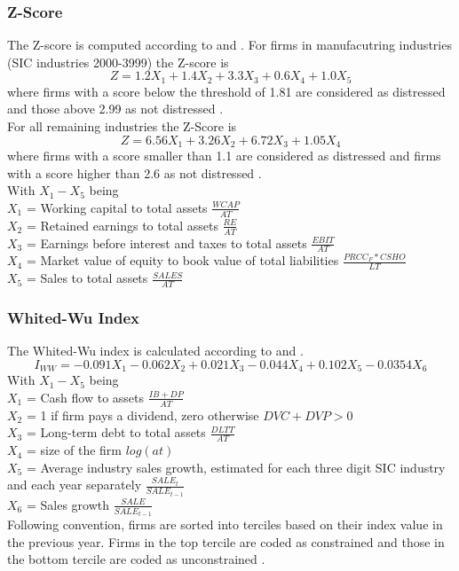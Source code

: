 \documentclass[12pt]{article}
\begin{document}
\subsubsection{Z-Score}
The Z-score is computed according to \citet[p.549]{Altman1968} and \citet[p.14]{Altman2002}. For firms in manufacutring industries (SIC industries 2000-3999) the Z-score is $$Z=1.2X_{1}+1.4X_{2}+3.3X_{3}+0.6X_{4}+1.0X_{5}$$ where firms with a score below the threshold of 1.81 are considered as distressed and those above 2.99 as not distressed \citep[p.14]{Altman2002}.\\
For all remaining industries the Z-Score is $$Z=6.56X_{1}+3.26X_{2}+6.72X_{3}+1.05X_{4}$$	
where firms with a score smaller than 1.1 are considered as distressed \citep[p.18]{Altman2002} and firms with a score higher than 2.6 as not distressed \citep[p.175]{Sulub2014}.\\
With $X_{1}- X_{5}$ being \\
	\indent$X_{1}$ = Working capital to total assets $\frac{WCAP}{AT}$\\
	\indent$X_{2}$ = Retained earnings to total assets $\frac{RE}{AT}$\\
	\indent$X_{3}$ = Earnings before interest and taxes to total assets $\frac{EBIT}{AT}$\\
	\indent$X_{4}$ = Market value of equity to book value of total liabilities $\frac{PRCC_F*CSHO}{LT}$\\
	\indent$X_{5}$ = Sales to total assets $\frac{SALES}{AT}$

\subsubsection{Whited-Wu Index}
The Whited-Wu index is calculated according to \citet[p.543]{Whited2006} and \citet[p.6]{Farre-mensa2013}. $$I_{WW}=-0.091X_{1}-0.062X_{2}+0.021X_{3}-0.044X_{4}+0.102X_{5}-0.0354X_{6}$$ With $X_{1}- X_{5}$ being \\
	\indent$X_{1}$ = Cash flow to assets $\frac{IB+DP}{AT}$\\
	\indent$X_{2}$ = 1 if firm pays a dividend, zero otherwise $DVC+DVP>0$\\
	\indent$X_{3}$ = Long-term debt to total assets $\frac{DLTT}{AT}$\\
	\indent$X_{4}$ = size of the firm $log(at)$\\
	\indent$X_{5}$ = Average industry sales growth, estimated for each three digit SIC industry \indent and each year separately $\frac{SALE_{t}}{SALE_{t-1}}$ \\
	\indent$X_{6}$ = Sales growth $\frac{SALE}{SALE_{t-1}}$\\
Following convention, firms are sorted into terciles based on their index value in the previous year. Firms in the top tercile are coded as constrained and those in the bottom tercile are coded as unconstrained \citep[p.38]{Farre-mensa2013}. 
\end{document}
